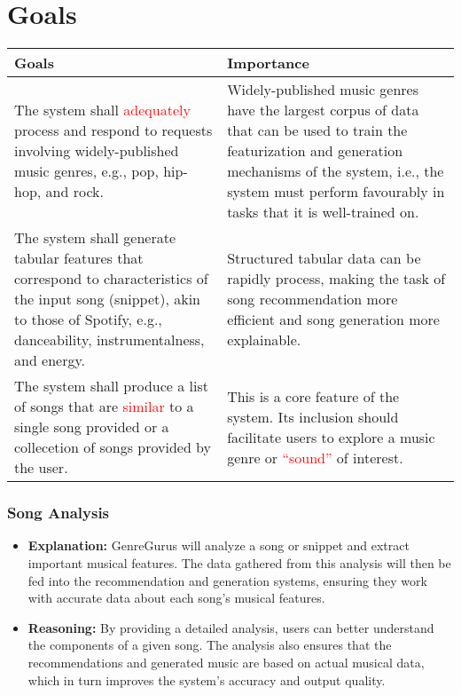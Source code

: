 \documentclass{article}
\begin{document}
\section{Goals}
\begin{table}[h]
    \centering
    \begin{tabular}{|| p{} | p{} ||}
        \hline
        \textbf{Goals} & \textbf{Importance} \\
        \hline
        The system shall \textcolor{red}{adequately} process and respond to 
        requests involving widely-published music genres, e.g., pop, hip-hop, 
        and rock. & Widely-published music genres have the largest corpus of 
        data that can be used to train the featurization and generation 
        mechanisms of the system, i.e., the system must perform favourably in 
        tasks that it is well-trained on. \\
        \hline
        The system shall generate tabular features that correspond to characteristics 
        of the input song (snippet), akin to those of Spotify, e.g., danceability, 
        instrumentalness, and energy. & Structured tabular data can be rapidly process, 
        making the task of song recommendation more efficient and song generation 
        more explainable. \\
        \hline
        The system shall produce a list of songs that are \textcolor{red}{similar} 
        to a single song provided or a collecetion of songs provided by the user. & 
        This is a core feature of the system. Its inclusion should facilitate users 
        to explore a music genre or \textcolor{red}{``sound''} of interest. \\
        \hline
    \end{tabular}
\end{table}

\subsubsection*{Song Analysis}
\begin{itemize}
    \item \textbf{Explanation:} GenreGurus will analyze a song or snippet and extract important musical features. The data gathered from this analysis will then be fed into the recommendation and generation systems, ensuring they work with accurate data about each song's musical features.
    \item \textbf{Reasoning:} By providing a detailed analysis, users can better understand the components of a given song. The analysis also ensures that the recommendations and generated music are based on actual musical data, which in turn improves the system’s accuracy and output quality.
\end{itemize}
\end{document}
